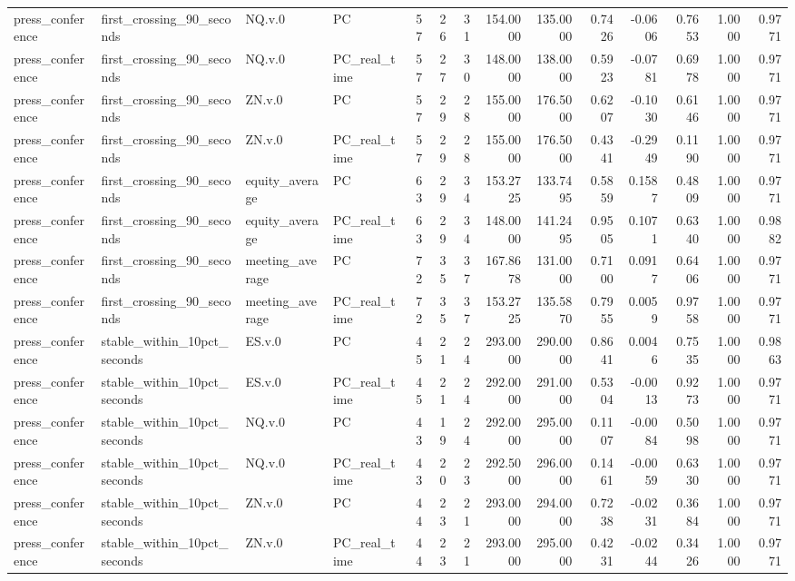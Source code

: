 \begin{tabular}{llllrrrrrrrrrr}
press_conference & first_crossing_90_seconds & NQ.v.0 & PC & 57 & 26 & 31 & 154.0000 & 135.0000 & 0.7426 & -0.0606 & 0.7653 & 1.0000 & 0.9771 \\
press_conference & first_crossing_90_seconds & NQ.v.0 & PC_real_time & 57 & 27 & 30 & 148.0000 & 138.0000 & 0.5923 & -0.0781 & 0.6978 & 1.0000 & 0.9771 \\
press_conference & first_crossing_90_seconds & ZN.v.0 & PC & 57 & 29 & 28 & 155.0000 & 176.5000 & 0.6207 & -0.1030 & 0.6146 & 1.0000 & 0.9771 \\
press_conference & first_crossing_90_seconds & ZN.v.0 & PC_real_time & 57 & 29 & 28 & 155.0000 & 176.5000 & 0.4341 & -0.2949 & 0.1190 & 1.0000 & 0.9771 \\
press_conference & first_crossing_90_seconds & equity_average & PC & 63 & 29 & 34 & 153.2725 & 133.7495 & 0.5859 & 0.1587 & 0.4809 & 1.0000 & 0.9771 \\
press_conference & first_crossing_90_seconds & equity_average & PC_real_time & 63 & 29 & 34 & 148.0000 & 141.2495 & 0.9505 & 0.1071 & 0.6340 & 1.0000 & 0.9882 \\
press_conference & first_crossing_90_seconds & meeting_average & PC & 72 & 35 & 37 & 167.8678 & 131.0000 & 0.7100 & 0.0917 & 0.6406 & 1.0000 & 0.9771 \\
press_conference & first_crossing_90_seconds & meeting_average & PC_real_time & 72 & 35 & 37 & 153.2725 & 135.5870 & 0.7955 & 0.0059 & 0.9758 & 1.0000 & 0.9771 \\
press_conference & stable_within_10pct_seconds & ES.v.0 & PC & 45 & 21 & 24 & 293.0000 & 290.0000 & 0.8641 & 0.0046 & 0.7535 & 1.0000 & 0.9863 \\
press_conference & stable_within_10pct_seconds & ES.v.0 & PC_real_time & 45 & 21 & 24 & 292.0000 & 291.0000 & 0.5304 & -0.0013 & 0.9273 & 1.0000 & 0.9771 \\
press_conference & stable_within_10pct_seconds & NQ.v.0 & PC & 43 & 19 & 24 & 292.0000 & 295.0000 & 0.1107 & -0.0084 & 0.5098 & 1.0000 & 0.9771 \\
press_conference & stable_within_10pct_seconds & NQ.v.0 & PC_real_time & 43 & 20 & 23 & 292.5000 & 296.0000 & 0.1461 & -0.0059 & 0.6330 & 1.0000 & 0.9771 \\
press_conference & stable_within_10pct_seconds & ZN.v.0 & PC & 44 & 23 & 21 & 293.0000 & 294.0000 & 0.7238 & -0.0231 & 0.3684 & 1.0000 & 0.9771 \\
press_conference & stable_within_10pct_seconds & ZN.v.0 & PC_real_time & 44 & 23 & 21 & 293.0000 & 295.0000 & 0.4231 & -0.0244 & 0.3426 & 1.0000 & 0.9771 \\

\end{tabular}
